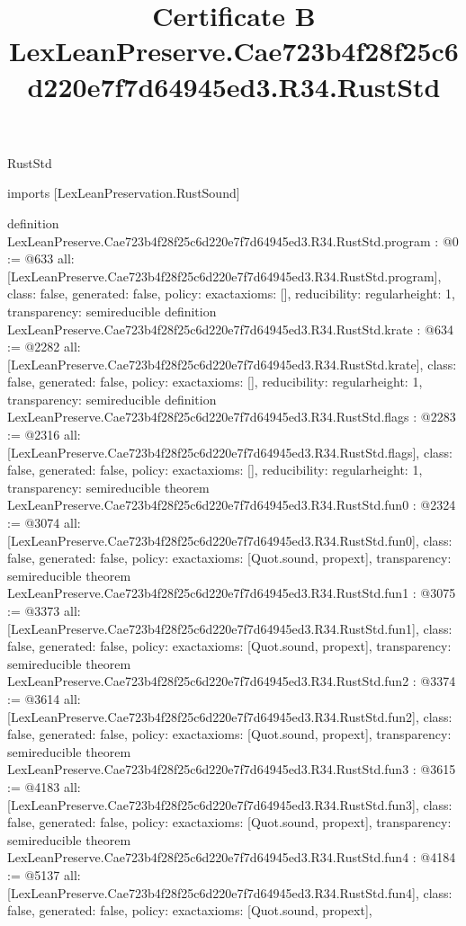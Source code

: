 \begin{lexlean}{RustStd}
\title{Certificate B LexLeanPreserve.Cae723b4f28f25c6d220e7f7d64945ed3.R34.RustStd}
\begin{coremodule}
imports [LexLeanPreservation.RustSound]

definition LexLeanPreserve.Cae723b4f28f25c6d220e7f7d64945ed3.R34.RustStd.program : @0 := @633 {
  all: [LexLeanPreserve.Cae723b4f28f25c6d220e7f7d64945ed3.R34.RustStd.program],
  class: false,
  generated: false,
  policy: exact{axioms: []},
  reducibility: regular{height: 1},
  transparency: semireducible
}
definition LexLeanPreserve.Cae723b4f28f25c6d220e7f7d64945ed3.R34.RustStd.krate : @634 := @2282 {
  all: [LexLeanPreserve.Cae723b4f28f25c6d220e7f7d64945ed3.R34.RustStd.krate],
  class: false,
  generated: false,
  policy: exact{axioms: []},
  reducibility: regular{height: 1},
  transparency: semireducible
}
definition LexLeanPreserve.Cae723b4f28f25c6d220e7f7d64945ed3.R34.RustStd.flags : @2283 := @2316 {
  all: [LexLeanPreserve.Cae723b4f28f25c6d220e7f7d64945ed3.R34.RustStd.flags],
  class: false,
  generated: false,
  policy: exact{axioms: []},
  reducibility: regular{height: 1},
  transparency: semireducible
}
theorem LexLeanPreserve.Cae723b4f28f25c6d220e7f7d64945ed3.R34.RustStd.fun0 : @2324 := @3074 {
  all: [LexLeanPreserve.Cae723b4f28f25c6d220e7f7d64945ed3.R34.RustStd.fun0],
  class: false,
  generated: false,
  policy: exact{axioms: [Quot.sound, propext]},
  transparency: semireducible
}
theorem LexLeanPreserve.Cae723b4f28f25c6d220e7f7d64945ed3.R34.RustStd.fun1 : @3075 := @3373 {
  all: [LexLeanPreserve.Cae723b4f28f25c6d220e7f7d64945ed3.R34.RustStd.fun1],
  class: false,
  generated: false,
  policy: exact{axioms: [Quot.sound, propext]},
  transparency: semireducible
}
theorem LexLeanPreserve.Cae723b4f28f25c6d220e7f7d64945ed3.R34.RustStd.fun2 : @3374 := @3614 {
  all: [LexLeanPreserve.Cae723b4f28f25c6d220e7f7d64945ed3.R34.RustStd.fun2],
  class: false,
  generated: false,
  policy: exact{axioms: [Quot.sound, propext]},
  transparency: semireducible
}
theorem LexLeanPreserve.Cae723b4f28f25c6d220e7f7d64945ed3.R34.RustStd.fun3 : @3615 := @4183 {
  all: [LexLeanPreserve.Cae723b4f28f25c6d220e7f7d64945ed3.R34.RustStd.fun3],
  class: false,
  generated: false,
  policy: exact{axioms: [Quot.sound, propext]},
  transparency: semireducible
}
theorem LexLeanPreserve.Cae723b4f28f25c6d220e7f7d64945ed3.R34.RustStd.fun4 : @4184 := @5137 {
  all: [LexLeanPreserve.Cae723b4f28f25c6d220e7f7d64945ed3.R34.RustStd.fun4],
  class: false,
  generated: false,
  policy: exact{axioms: [Quot.sound, propext]},
}
\end{coremodule}
\end{lexlean}
